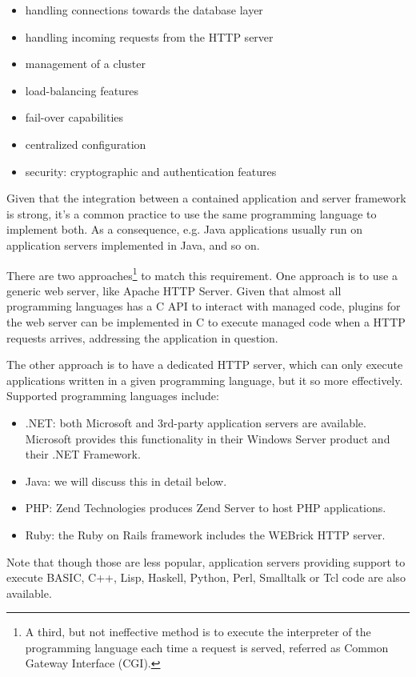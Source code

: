 \begin{itemize}
\item handling connections towards the database layer
\item handling incoming requests from the HTTP server
\item management of a cluster
\item load-balancing features
\item fail-over capabilities
\item centralized configuration
\item security: cryptographic and authentication features
\end{itemize}

Given that the integration between a contained application and server framework
is strong, it's a common practice to use the same programming language to
implement both. As a consequence, e.g. Java applications usually run on
application servers implemented in Java, and so on.

There are two approaches\footnote{A third, but not ineffective method is to
execute the interpreter of the programming language each time a request is
served, referred as Common Gateway Interface (CGI).} to match this requirement.
One approach is to use a generic web server, like Apache HTTP
Server\cite{apache-httpd}. Given that almost all programming languages has a C
API to interact with managed code, plugins for the web server can be
implemented in C to execute managed code when a HTTP requests arrives,
addressing the application in question.

The other approach is to have a dedicated HTTP server, which can only execute
applications written in a given programming language, but it so more
effectively. Supported programming languages include:

\begin{itemize}
\item .NET: both Microsoft and 3rd-party application servers are available.
Microsoft provides this functionality in their Windows Server product and their
.NET Framework.
\item Java: we will discuss this in detail below.
\item PHP: Zend Technologies produces Zend Server to host PHP applications.
\item Ruby: the Ruby on Rails framework includes the WEBrick HTTP server.
\end{itemize}

Note that though those are less popular, application servers providing support
to execute BASIC, C++, Lisp, Haskell, Python, Perl, Smalltalk or Tcl code are
also available.

